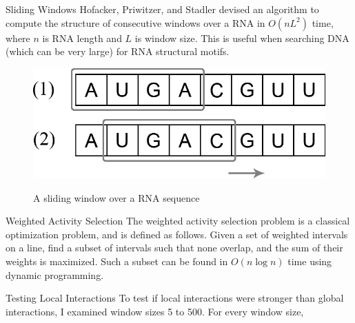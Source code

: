 \documentclass[final]{beamer}
\newlength{\onecolwid}
\begin{document}
\begin{frame}[t]
\begin{columns}[t]
\begin{column}{\onecolwid}
    
    
    \begin{block}{Sliding Windows}
            Hofacker, Priwitzer, and Stadler \cite{hofacker2008rna} devised an algorithm to compute the structure of consecutive windows over a RNA in $O(nL^2)$ time, where $n$ is RNA length and $L$ is window size. This is useful when searching DNA (which can be very large) for RNA structural motifs.
\vspace{0.25in}
        \begin{figure}
          \begin{center}
            \includegraphics[width=10in]{slidingwindow.png} \\
            \caption{A sliding window over a RNA sequence}
            \label{fig:slidingwindow}
          \end{center}
        \end{figure}            
            \vspace{0.25in}
         
          \end{block}
    
     \begin{block}{Weighted Activity Selection}
The weighted activity selection problem is a classical optimization problem, and is defined as follows. Given a set of weighted intervals on a line, find a subset of intervals such that none overlap, and the sum of their weights is maximized. Such a subset can be found in $O(n \log n)$ time using dynamic programming.
\vspace{0.25in}
         
          \end{block} 
          
          
     \begin{block}{Testing Local Interactions}
To test if local interactions were stronger than global interactions, I examined window sizes 5 to 500. For every window size,


\end{block}
\end{column}
\end{columns}
\end{frame}
\end{document}

